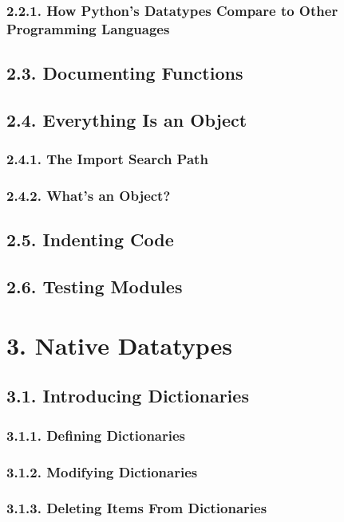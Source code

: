 \documentclass[oneside,12pt]{book}
\begin{document}
\subsection{2.2.1. How Python's Datatypes Compare to Other Programming
Languages}
       
\section{2.3. Documenting Functions}
\section{2.4. Everything Is an Object}
\subsection{2.4.1. The Import Search Path}
\subsection{2.4.2. What's an Object?}
       
\section{2.5. Indenting Code}
\section{2.6. Testing Modules}
   
\chapter{3. Native Datatypes}
\section{3.1. Introducing Dictionaries}
\subsection{3.1.1. Defining Dictionaries}
\subsection{3.1.2. Modifying Dictionaries}
\subsection{3.1.3. Deleting Items From Dictionaries}
       
\end{document}
